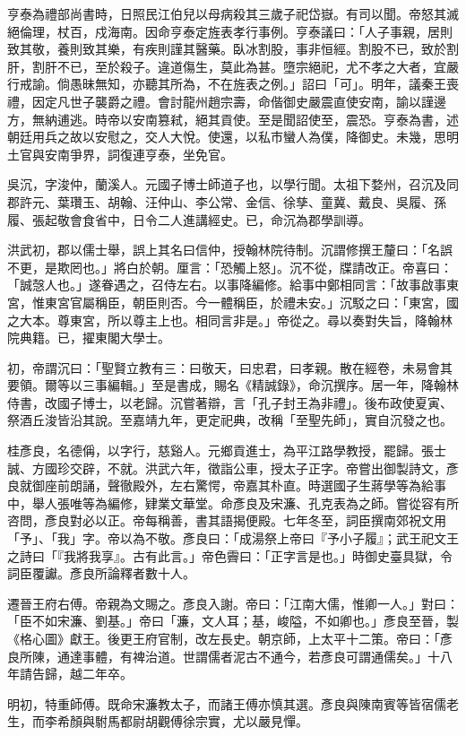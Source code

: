 \begin{pinyinscope}
亨泰為禮部尚書時，日照民江伯兒以母病殺其三歲子祀岱嶽。有司以聞。帝怒其滅絕倫理，杖百，戍海南。因命亨泰定旌表孝行事例。亨泰議曰：「人子事親，居則致其敬，養則致其樂，有疾則謹其醫藥。臥冰割股，事非恒經。割股不已，致於割肝，割肝不已，至於殺子。違道傷生，莫此為甚。墮宗絕祀，尤不孝之大者，宜嚴行戒諭。倘愚昧無知，亦聽其所為，不在旌表之例。」詔曰「可」。明年，議秦王喪禮，因定凡世子襲爵之禮。會討龍州趙宗壽，命偕御史嚴震直使安南，諭以謹邊方，無納逋逃。時帝以安南篡弒，絕其貢使。至是聞詔使至，震恐。亨泰為書，述朝廷用兵之故以安慰之，交人大悅。使還，以私市蠻人為僕，降御史。未幾，思明土官與安南爭界，詞復連亨泰，坐免官。

吳沉，字浚仲，蘭溪人。元國子博士師道子也，以學行聞。太祖下婺州，召沉及同郡許元、葉瓚玉、胡翰、汪仲山、李公常、金信、徐孳、童冀、戴良、吳履、孫履、張起敬會食省中，日令二人進講經史。已，命沉為郡學訓導。

洪武初，郡以儒士舉，誤上其名曰信仲，授翰林院待制。沉謂修撰王釐曰：「名誤不更，是欺罔也。」將白於朝。厘言：「恐觸上怒」。沉不從，牒請改正。帝喜曰：「誠愨人也。」遂眷遇之，召侍左右。以事降編修。給事中鄭相同言：「故事啟事東宮，惟東宮官屬稱臣，朝臣則否。今一體稱臣，於禮未安。」沉駁之曰：「東宮，國之大本。尊東宮，所以尊主上也。相同言非是。」帝從之。尋以奏對失旨，降翰林院典籍。已，擢東閣大學士。

初，帝謂沉曰：「聖賢立教有三：曰敬天，曰忠君，曰孝親。散在經卷，未易會其要領。爾等以三事編輯。」至是書成，賜名《精誠錄》，命沉撰序。居一年，降翰林侍書，改國子博士，以老歸。沉嘗著辯，言「孔子封王為非禮」。後布政使夏寅、祭酒丘浚皆沿其說。至嘉靖九年，更定祀典，改稱「至聖先師」，實自沉發之也。

桂彥良，名德偁，以字行，慈谿人。元鄉貢進士，為平江路學教授，罷歸。張士誠、方國珍交辟，不就。洪武六年，徵詣公車，授太子正字。帝嘗出御製詩文，彥良就御座前朗誦，聲徹殿外，左右驚愕，帝嘉其朴直。時選國子生蔣學等為給事中，舉人張唯等為編修，肄業文華堂。命彥良及宋濂、孔克表為之師。嘗從容有所咨問，彥良對必以正。帝每稱善，書其語揭便殿。七年冬至，詞臣撰南郊祝文用「予」、「我」字。帝以為不敬。彥良曰：「成湯祭上帝曰『予小子履』；武王祀文王之詩曰「『我將我享』。古有此言。」帝色霽曰：「正字言是也。」時御史臺具獄，令詞臣覆讞。彥良所論釋者數十人。

遷晉王府右傅。帝親為文賜之。彥良入謝。帝曰：「江南大儒，惟卿一人。」對曰：「臣不如宋濂、劉基。」帝曰「濂，文人耳；基，峻隘，不如卿也。」彥良至晉，製《格心圖》獻王。後更王府官制，改左長史。朝京師，上太平十二策。帝曰：「彥良所陳，通達事體，有裨治道。世謂儒者泥古不通今，若彥良可謂通儒矣。」十八年請告歸，越二年卒。

明初，特重師傅。既命宋濂教太子，而諸王傅亦慎其選。彥良與陳南賓等皆宿儒老生，而李希顏與駙馬都尉胡觀傅徐宗實，尤以嚴見憚。


\end{pinyinscope}

